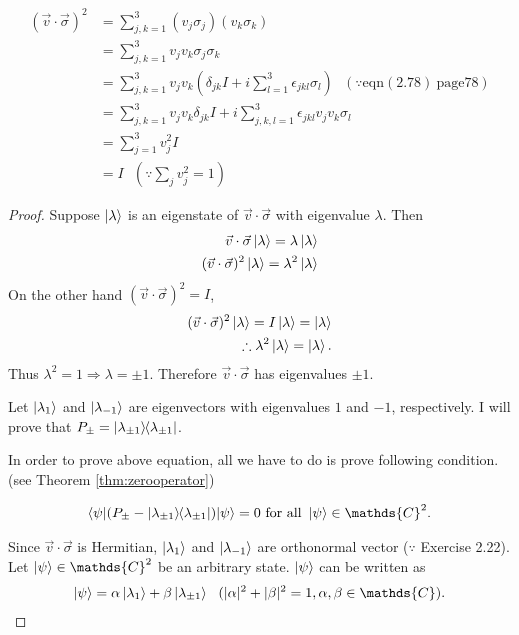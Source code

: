 	\begin{align*}
	(\vec{v} \cdot \vec{\sigma})^2 &= \sum_{j,k=1}^3 (v_j \sigma_j)  (v_k \sigma_k)\\
	&= \sum_{j,k=1}^3 v_j v_k \sigma_j \sigma_k\\
	&= \sum_{j,k=1}^3 v_j v_k \left(\delta_{jk}I + i \sum_{l=1}^3 \epsilon_{jkl}\sigma_l \right) ~~~(\because \text{eqn}(2.78)~ \text{page} 78)\\
	&= \sum_{j,k=1}^3 v_j v_k \delta_{jk}I  + i \sum_{j,k,l=1}^3 \epsilon_{jkl} v_j v_k \sigma_l\\
	&= \sum_{j=1}^3 v_j^2 I\\
	&= I ~~~\left(\because \sum_j v_j^2 = 1 \right)
	\end{align*}


	\begin{proof}
		Suppose $\ket{\lambda}$ is an eigenstate of $\vec{v} \cdot \vec{\sigma}$ with eigenvalue $\lambda$. Then
		\begin{align*}
		\vec{v} \cdot \vec{\sigma} \ket{\lambda} = \lambda \ket{\lambda}\\
		(\vec{v} \cdot \vec{\sigma})^2 \ket{\lambda} = \lambda^2 \ket{\lambda}
		\end{align*}
		On the other hand $(\vec{v} \cdot \vec{\sigma})^2 = I$,
		\begin{align*}
		(\vec{v} \cdot \vec{\sigma})^2 \ket{\lambda} = I \ket{\lambda} = \ket{\lambda}\\
		\therefore \lambda^2\ket{\lambda} = \ket{\lambda}.
		\end{align*}
		Thus $\lambda^2 = 1 \Rightarrow \lambda = \pm 1$. Therefore $\vec{v} \cdot \vec{\sigma}$ has eigenvalues $\pm 1$.

		Let $\ket{\lambda_1}$ and $\ket{\lambda_{-1}}$ are eigenvectors with eigenvalues $1$ and $-1$, respectively.
		I will prove that $P_\pm = \ket{\lambda_{\pm 1}}\hspace{-1mm} \bra{\lambda_{\pm 1}}$.

		In order to prove above equation, all we have to do is prove following condition. (see Theorem \ref{thm:zerooperator})
		\begin{screen}
			\begin{align}
				\braket{\psi | (P_\pm - \kb{\lambda_{\pm 1}})| \psi} = 0 \text{ for all } \ket{\psi} \in \mathds{C}^2.
			\end{align}
		\end{screen}

		Since $\vec{v} \cdot \vec{\sigma}$ is Hermitian, $\ket{\lambda_1}$ and $\ket{\lambda_{-1}}$ are orthonormal vector ($\because $ Exercise 2.22).
		Let $\ket{\psi} \in \mathds{C}^2$ be an arbitrary state. $\ket{\psi}$ can be written as
		\begin{align*}
		\ket{\psi} = \alpha \ket{\lambda_1} + \beta \ket{\lambda_{\pm 1}} ~~(|\alpha|^2 + |\beta|^2 = 1, \alpha, \beta \in \mathds{C}).
		\end{align*}


\end{proof}
